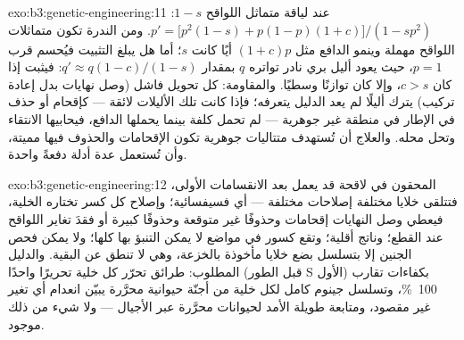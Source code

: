 \begin{solution}{exo:b3:genetic-engineering:11}
عند لياقة متماثل اللواقح $1 - s$: $p' = \bigl[p^{2}(1-s) + p(1-p)(1+c)
\bigr]/(1 - sp^{2})$. ومن الندرة تكون متماثلات اللواقح مهملة وينمو
الدافع مثل $(1+c)p$ أيًا كانت $s$؛ أما هل يبلغ التثبيت فيُحسم
قرب $p = 1$، حيث يعود أليل بري نادر تواتره $q$
بمقدار $q' \approx q(1-c)/(1-s)$: فيثبت إذا كان $c > s$، وإلا كان توازنًا
وسطيًا. والمقاومة: كل تحويل فاشل
(وصل نهايات بدل إعادة تركيب) يترك أليلًا لم يعد الدليل
يتعرفه؛ فإذا كانت تلك الأليلات لائقة --- كإقحام أو حذف في الإطار في
منطقة غير جوهرية --- لم تحمل كلفة بينما يحملها الدافع، فيحابيها
الانتقاء وتحل محله. والعلاج أن تُستهدف متتاليات جوهرية تكون
الإقحامات والحذوف فيها مميتة، وأن تُستعمل عدة أدلة دفعةً واحدة.
\end{solution}

\begin{solution}{exo:b3:genetic-engineering:12}
 المحقون في لاقحة قد يعمل بعد الانقسامات الأولى،
فتتلقى خلايا مختلفة إصلاحات مختلفة --- أي فسيفسائية؛ وإصلاح
كل كسر تختاره الخلية، فيعطي وصل النهايات إقحامات وحذوفًا
غير متوقعة وحذوفًا كبيرة أو فقدَ تغاير اللواقح عند القطع؛ وناتج
 أقلية؛ وتقع كسور 
في مواضع لا يمكن التنبؤ بها كلها؛ ولا يمكن فحص الجنين
إلا بتسلسل بضع خلايا مأخوذة بالخزعة، وهي لا تنطق عن
البقية. والدليل المطلوب: طرائق تحرّر كل خلية تحريرًا واحدًا
(قبل الطور S الأول) بكفاءات تقارب \qty{100}{\%}،
وتسلسل جينوم كامل لكل خلية من أجنّة حيوانية محرَّرة يبيّن
انعدام أي تغير غير مقصود، ومتابعة طويلة الأمد لحيوانات محرَّرة عبر
الأجيال --- ولا شيء من ذلك موجود.
\end{solution}

